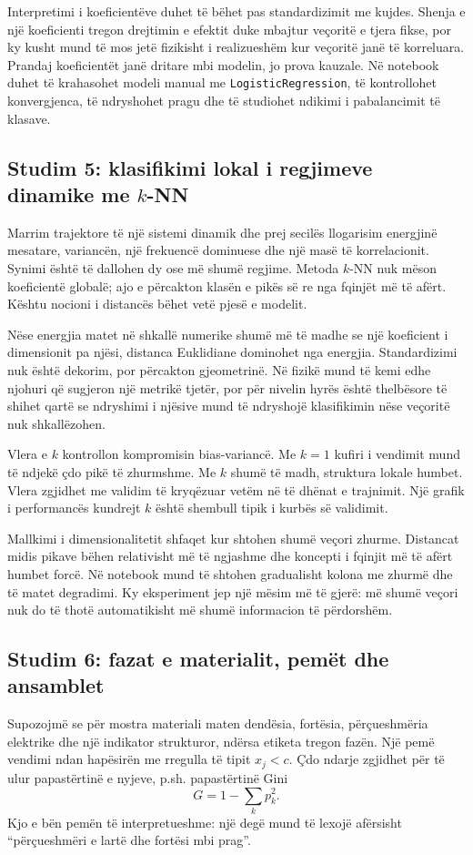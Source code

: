 \documentclass[12pt,a4paper,oneside]{book}
\begin{document}
Interpretimi i koeficientëve duhet të bëhet pas standardizimit me kujdes. Shenja e një koeficienti tregon drejtimin e efektit duke mbajtur veçoritë e tjera fikse, por ky kusht mund të mos jetë fizikisht i realizueshëm kur veçoritë janë të korreluara. Prandaj koeficientët janë dritare mbi modelin, jo prova kauzale. Në notebook duhet të krahasohet modeli manual me \texttt{LogisticRegression}, të kontrollohet konvergjenca, të ndryshohet pragu dhe të studiohet ndikimi i pabalancimit të klasave.

\subsection*{Studim 5: klasifikimi lokal i regjimeve dinamike me $k$-NN}
Marrim trajektore të një sistemi dinamik dhe prej secilës llogarisim energjinë mesatare, variancën, një frekuencë dominuese dhe një masë të korrelacionit. Synimi është të dallohen dy ose më shumë regjime. Metoda $k$-NN nuk mëson koeficientë globalë; ajo e përcakton klasën e pikës së re nga fqinjët më të afërt. Kështu nocioni i distancës bëhet vetë pjesë e modelit.

Nëse energjia matet në shkallë numerike shumë më të madhe se një koeficient i dimensionit pa njësi, distanca Euklidiane dominohet nga energjia. Standardizimi nuk është dekorim, por përcakton gjeometrinë. Në fizikë mund të kemi edhe njohuri që sugjeron një metrikë tjetër, por për nivelin hyrës është thelbësore të shihet qartë se ndryshimi i njësive mund të ndryshojë klasifikimin nëse veçoritë nuk shkallëzohen.

Vlera e $k$ kontrollon kompromisin bias-variancë. Me $k=1$ kufiri i vendimit mund të ndjekë çdo pikë të zhurmshme. Me $k$ shumë të madh, struktura lokale humbet. Vlera zgjidhet me validim të kryqëzuar vetëm në të dhënat e trajnimit. Një grafik i performancës kundrejt $k$ është shembull tipik i kurbës së validimit.

Mallkimi i dimensionalitetit shfaqet kur shtohen shumë veçori zhurme. Distancat midis pikave bëhen relativisht më të ngjashme dhe koncepti i fqinjit më të afërt humbet forcë. Në notebook mund të shtohen gradualisht kolona me zhurmë dhe të matet degradimi. Ky eksperiment jep një mësim më të gjerë: më shumë veçori nuk do të thotë automatikisht më shumë informacion të përdorshëm.

\subsection*{Studim 6: fazat e materialit, pemët dhe ansamblet}
Supozojmë se për mostra materiali maten dendësia, fortësia, përçueshmëria elektrike dhe një indikator strukturor, ndërsa etiketa tregon fazën. Një pemë vendimi ndan hapësirën me rregulla të tipit $x_j<c$. Çdo ndarje zgjidhet për të ulur papastërtinë e nyjeve, p.sh. papastërtinë Gini
\[
G=1-\sum_k p_k^2.
\]
Kjo e bën pemën të interpretueshme: një degë mund të lexojë afërsisht “përçueshmëri e lartë dhe fortësi mbi prag”.
\end{document}
